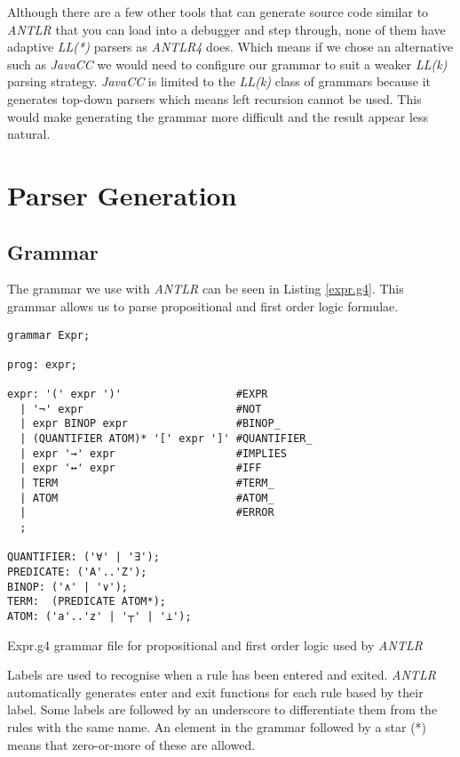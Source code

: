 \documentclass{report}
\begin{document}
Although there are a few other tools that can generate source code similar to \emph{ANTLR} that you can load into a debugger and step through, none of them have adaptive \emph{LL(*)} parsers as \emph{ANTLR4} does. Which means if we chose an alternative such as \emph{JavaCC} we would need to configure our grammar to suit a weaker \emph{LL(k)} parsing strategy. \emph{JavaCC} is limited to the \emph{LL(k)} class of grammars because it generates top-down parsers which means left recursion cannot be used. This would make generating the grammar more difficult and the result appear less natural.

\section{Parser Generation}

\subsection{Grammar}

The grammar we use with \emph{ANTLR} can be seen in Listing \ref{expr.g4}. This grammar allows us to parse propositional and first order logic formulae.

\begin{listing}[ht]
\begin{verbatim}
grammar Expr; 

prog: expr;

expr: '(' expr ')'                  #EXPR
  | '¬' expr                        #NOT
  | expr BINOP expr                 #BINOP_
  | (QUANTIFIER ATOM)* '[' expr ']' #QUANTIFIER_
  | expr '→' expr                   #IMPLIES
  | expr '↔' expr                   #IFF
  | TERM                            #TERM_
  | ATOM                            #ATOM_
  |                                 #ERROR
  ;

QUANTIFIER: ('∀' | '∃');
PREDICATE: ('A'..'Z');
BINOP: ('∧' | '∨');
TERM:  (PREDICATE ATOM*);
ATOM: ('a'..'z' | '┬' | '⊥');
\end{verbatim}
\caption{Expr.g4 grammar file for propositional and first order logic used by \emph{ANTLR}}
\label{expr.g4}
\end{listing}

Labels are used to recognise when a rule has been entered and exited. \emph{ANTLR} automatically generates enter and exit functions for each rule based by their label. Some labels are followed by an underscore to differentiate them from the rules with the same name. An element in the grammar followed by a star (*) means that zero-or-more of these are allowed.
\end{document}
